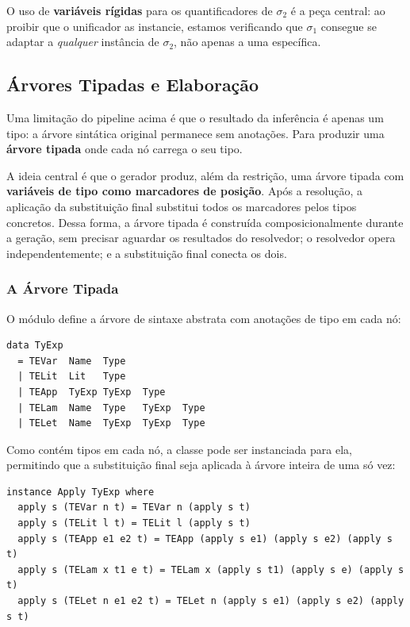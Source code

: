   O uso de \textbf{variáveis rígidas} para os quantificadores de
  \(\sigma_2\) é a peça central: ao proibir que o unificador as instancie,
  estamos verificando que \(\sigma_1\) consegue se adaptar a
  \emph{qualquer} instância de \(\sigma_2\), não apenas a uma específica.

  \subsection{Árvores Tipadas e Elaboração}

  Uma limitação do pipeline acima é que o resultado da inferência é
  apenas um tipo: a árvore sintática original permanece sem anotações.
  Para produzir uma \textbf{árvore tipada} onde cada nó carrega o seu tipo.

  A ideia central é que o gerador produz, além da restrição, uma árvore
  tipada com \textbf{variáveis de tipo como marcadores de posição}.
  Após a resolução, a aplicação da substituição final substitui todos
  os marcadores pelos tipos concretos. Dessa forma,
  a árvore tipada é construída composicionalmente durante a geração,
  sem precisar aguardar os resultados do resolvedor; o resolvedor opera
  independentemente; e a substituição final conecta os dois.

  \subsubsection{A Árvore Tipada}

  O módulo  define a árvore de
  sintaxe abstrata com anotações de tipo em cada nó:

\begin{verbatim}
data TyExp
  = TEVar  Name  Type
  | TELit  Lit   Type
  | TEApp  TyExp TyExp  Type
  | TELam  Name  Type   TyExp  Type
  | TELet  Name  TyExp  TyExp  Type
\end{verbatim}

  Como  contém tipos em cada nó, a
  classe  pode ser instanciada para ela,
  permitindo que a substituição final seja aplicada à árvore inteira de
  uma só vez:

\begin{verbatim}
instance Apply TyExp where
  apply s (TEVar n t) = TEVar n (apply s t)
  apply s (TELit l t) = TELit l (apply s t)
  apply s (TEApp e1 e2 t) = TEApp (apply s e1) (apply s e2) (apply s t)
  apply s (TELam x t1 e t) = TELam x (apply s t1) (apply s e) (apply s t)
  apply s (TELet n e1 e2 t) = TELet n (apply s e1) (apply s e2) (apply s t)
\end{verbatim}

